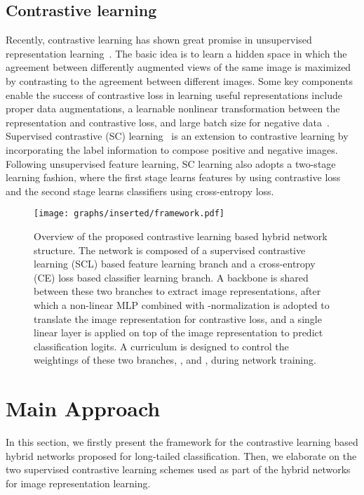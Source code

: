 \documentclass[final]{cvpr}
\begin{document}
\subsection{Contrastive learning}
Recently, contrastive learning has shown great promise in unsupervised representation learning~\cite{simclr,moco}. The basic idea is to learn a hidden space in which the agreement between differently augmented views of the same image is maximized by contrasting to the agreement between different images. Some key components enable the success of contrastive loss in learning useful representations include proper data augmentations, a learnable nonlinear transformation between the representation and contrastive loss, and large batch size for negative data~\cite{simclr}. Supervised contrastive (SC) learning~\cite{SC} is an extension to contrastive learning by incorporating the label information to compose positive and negative images. Following unsupervised feature learning, SC learning also adopts a two-stage learning fashion, where the first stage learns features by using contrastive loss and the second stage learns classifiers using cross-entropy loss. 






\begin{figure*}[h]
\begin{center}   
{
\texttt{[image: graphs/inserted/framework.pdf]}
}
\caption{Overview of the proposed contrastive learning based hybrid network structure. The network is composed of a supervised contrastive learning (SCL) based feature learning branch and a cross-entropy (CE) loss based classifier learning branch. A backbone is shared between these two branches to extract image representations, after which a non-linear MLP  combined with -normalization is adopted to translate the image representation for contrastive loss, and a single linear layer  is applied on top of the image representation to predict classification logits. A curriculum  is designed to control the weightings of these two branches, \ie,  and , during network training. } 
\label{fig:framework}
\end{center}
\end{figure*}

\section{Main Approach}

In this section, we firstly present the framework for the contrastive learning based hybrid networks proposed for long-tailed classification. Then, we elaborate on the two supervised contrastive learning schemes used as part of the hybrid networks for image representation learning. 
\end{document}

